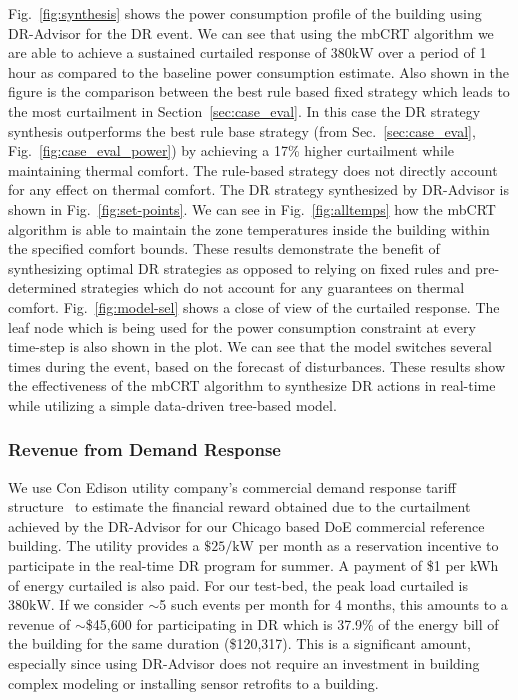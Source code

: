 Fig.~\ref{fig:synthesis} shows the power consumption profile of the building using DR-Advisor for the DR event. 
We can see that using the mbCRT algorithm we are able to achieve a sustained curtailed response of $380\si{\kilo\watt}$ over a period of 1 hour as compared to the baseline power consumption estimate.  Also shown in the figure is the comparison between the best rule based fixed strategy which leads to the most curtailment in Section~\ref{sec:case_eval}. In this case the DR strategy synthesis outperforms the best rule base strategy (from Sec.~\ref{sec:case_eval}, Fig.~\ref{fig:case_eval_power}) by achieving a 17\% higher curtailment while maintaining thermal comfort. The rule-based strategy does not directly account for any effect on thermal comfort.
The DR strategy synthesized by DR-Advisor is shown in Fig.~\ref{fig:set-points}. 
We can see in Fig.~\ref{fig:alltemps} how the mbCRT algorithm is able to maintain the zone temperatures inside the building within the specified comfort bounds.
These results demonstrate the benefit of synthesizing optimal DR strategies as opposed to relying on fixed rules and pre-determined strategies which do not account for any guarantees on thermal comfort. 
Fig.~\ref{fig:model-sel} shows a close of view of the curtailed response. The leaf node which is being used for the power consumption constraint at every time-step is also shown in the plot.
We can see that the model switches several times during the event, based on the forecast of disturbances. 
These results show the effectiveness of the mbCRT algorithm to synthesize DR actions in real-time while utilizing a simple data-driven tree-based model.

\subsubsection{\textbf{Revenue from Demand Response}}
We use Con Edison utility company's commercial demand response tariff structure~\cite{edison} to estimate the financial reward obtained due to the curtailment achieved by the DR-Advisor for our Chicago based DoE commercial reference building.
The utility provides a $\$25/\si{\kilo\watt}$ per month as a reservation incentive to participate in the real-time DR program for summer. A payment of \$1 per kWh of energy curtailed is also paid. For our test-bed, the peak load curtailed is $380\si{\kilo\watt}$. If we consider $\sim$5 such events per month for 4 months, this amounts to a revenue of $\sim$\$45,600 for participating in DR which is 37.9\% of the energy bill of the building for the same duration (\$120,317).
This is a significant amount, especially since using DR-Advisor does not require an investment in building complex modeling or installing sensor retrofits to a building.

